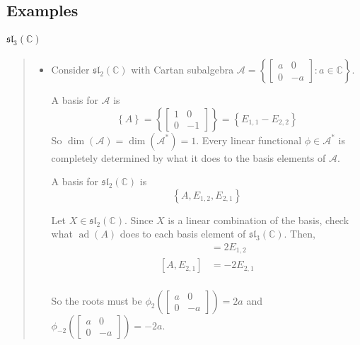 \documentclass[letterpaper, 10pt]{article}
\theoremstyle{theostyle}
\begin{document}
\subsection{Examples}

\paragraph{\(\mathfrak{sl}_3 (\mathbb{C})\)}
\begin{quote}
    \begin{itemize}
        \item Consider \(\mathfrak{sl}_2 (\mathbb{C})\) with Cartan subalgebra
        \(\mathcal{A} = \left\{\begin{bmatrix}
        a & 0 \\
        0 & -a
        \end{bmatrix} : a \in \mathbb{C} \right\}\).

        A basis for \(\mathcal{A}\) is 
        \[\left\{A\right\} = \left\{\begin{bmatrix}
            1 & 0 \\
            0 & -1
        \end{bmatrix}\right\} = \left\{E_{1, 1} - E_{2, 2}\right\}\]
        So \(\dim{(\mathcal{A})} = \dim(\mathcal{A}^\ast) = 1\).
        Every linear functional \(\phi \in \mathcal{A}^\ast\) is completely determined by what it does to the basis elements of \(\mathcal{A}\).
        
        A basis for \(\mathfrak{sl}_2(\mathbb{C})\) is 
        \[\left\{A, E_{1, 2}, E_{2, 1}\right\}\]

        Let \(X \in \mathfrak{sl}_2 (\mathbb{C})\).
        Since \(X\) is a linear combination of the basis, check what \(\operatorname{ad}(A)\) does to each basis element of \(\mathfrak{sl}_3 (\mathbb{C})\).
        Then,
        \begin{align*}
            [A, E_{1, 2}] &= 2E_{1, 2} \\
            [A, E_{2, 1}] &= -2E_{2, 1} \\
        \end{align*}

        So the roots must be \(\phi_2 \left(\begin{bmatrix}
            a & 0 \\
            0 & -a
            \end{bmatrix} \right) = 2a\) 
        and \(\phi_{-2} \left(\begin{bmatrix}
            a & 0 \\
            0 & -a
        \end{bmatrix} \right) = -2a\).


\end{itemize}
\end{quote}
\end{document}
